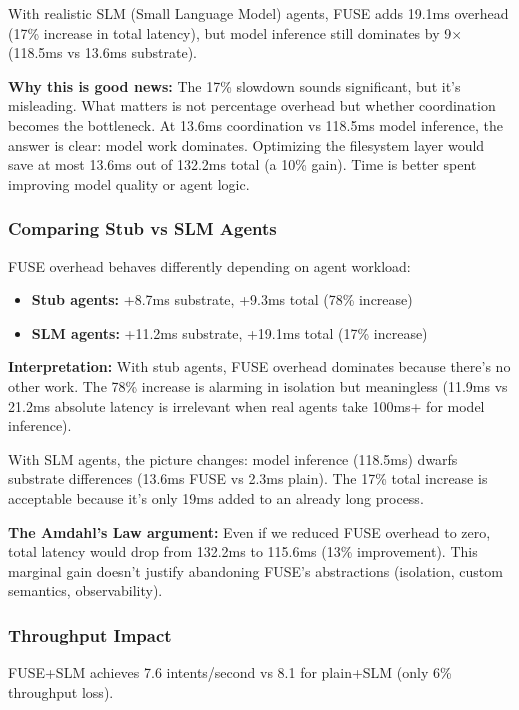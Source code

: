 \documentclass[11pt]{article}
\begin{document}
With realistic SLM (Small Language Model) agents, FUSE adds 19.1ms overhead (17\% increase in total latency), but model inference still dominates by 9× (118.5ms vs 13.6ms substrate).

\textbf{Why this is good news:} The 17\% slowdown sounds significant, but it's misleading. What matters is not percentage overhead but whether coordination becomes the bottleneck. At 13.6ms coordination vs 118.5ms model inference, the answer is clear: model work dominates. Optimizing the filesystem layer would save at most 13.6ms out of 132.2ms total (a 10\% gain). Time is better spent improving model quality or agent logic.

\subsubsection{Comparing Stub vs SLM Agents}

FUSE overhead behaves differently depending on agent workload:

\begin{itemize}
\item \textbf{Stub agents:} +8.7ms substrate, +9.3ms total (78\% increase)
\item \textbf{SLM agents:} +11.2ms substrate, +19.1ms total (17\% increase)
\end{itemize}

\textbf{Interpretation:} With stub agents, FUSE overhead dominates because there's no other work. The 78\% increase is alarming in isolation but meaningless (11.9ms vs 21.2ms absolute latency is irrelevant when real agents take 100ms+ for model inference).

With SLM agents, the picture changes: model inference (118.5ms) dwarfs substrate differences (13.6ms FUSE vs 2.3ms plain). The 17\% total increase is acceptable because it's only 19ms added to an already long process.

\textbf{The Amdahl's Law argument:} Even if we reduced FUSE overhead to zero, total latency would drop from 132.2ms to 115.6ms (13\% improvement). This marginal gain doesn't justify abandoning FUSE's abstractions (isolation, custom semantics, observability).

\subsubsection{Throughput Impact}

FUSE+SLM achieves 7.6 intents/second vs 8.1 for plain+SLM (only 6\% throughput loss).
\end{document}
